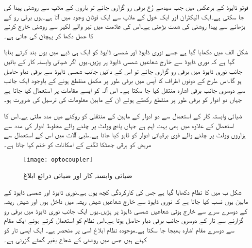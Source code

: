 فوٹو ڈایوڈ کے برعکس   میں جب سیدھے رُخ برقی رو گزاری جائے تو  باروں کے ملاپ سے روشنی پیدا کی جا سکتی ہے۔ایک الیکٹران اور ایک خول کے ملاپ سے ایک فوٹان وجود میں آتا ہے۔یوں برقی رو کے بڑھانے سے پیدا روشنی کی شدت بڑھتی ہے۔اس کی علامت میں تیر والے لکیر سے روشنی خارج کرنے کا عمل دکھا کر پہچان کی جاتی ہے۔

شکل  الف میں   دکھایا گیا ہے جسے نوری ڈایوڈ اور شمسی ڈایوڈ کو ایک ہی ڈبے میں یوں بند کرتے بنایا گیا ہے کہ نوری ڈایوڈ سے خارج شعاعیں شمسی ڈایوڈ پر پڑیں۔یوں اگر ضیائی وابستہ کار کے بائیں جانب نوری ڈایوڈ میں برقی رو گزاری جائے تو اس کے دائیں جانب شمسی ڈایوڈ سے برقی دباو حاصل ہو گا۔اس طرح  کے دونوں اطراف کا آپس میں برقی طور پر مکمل منقطع ہونے کے باوجود ایک جانب سے دوسری جانب برقی اشارہ منتقل کیا جا سکتا  ہے۔ اس آلہ کو ایسے مقامات پر استعمال کیا جاتا ہے جہاں دو ادوار کو برقی طور پر منقطع رکھتے ہوئے ان کے مابین معلومات کی ترسیل کی ضرورت ہو۔

ضیائی وابستہ کار کے استعمال سے دو ادوار کے مابین  کے منتقلی کو روکنے میں مدد ملتی ہے۔اس کا استعمال  کے علاوہ   میں بھی بہت اہم ہے جہاں پانچ وولٹ پر چلنے والے مخلوط ادوار کی مدد سے ہزاروں وولٹ پر چلنے والے قوی برقیاتی ادوار کو قابو کیا جاتا ہے۔طبی آلات میں اس کے استعمال سے مریض کو برقی جھٹکا لگنے کے امکانات کو ختم کیا جاتا ہے۔
\begin{figure}
\centering
\texttt{[image: optocoupler]}
\caption{ضیائی وابستہ کار اور ضیائی ذرائع ابلاغ}
\label{شکل_ضیائی_وابستہ_کار}
\end{figure}
شکل  ب میں   کا نظام دکھایا گیا ہے جس کی کارکردگی کچھ یوں ہے۔نوری ڈایوڈ اور شمسی ڈایوڈ کے مابین  یوں نسب کیا جاتا ہے کہ نوری ڈایوڈ سے خارج شعاعیں شیش ریشہ میں داخل ہوں اور شیش ریشہ کے دوسرے سرے سے خارج ہوتی شعاعیں شمسی ڈایوڈ پر پڑیں۔یوں ایک جانب نوری ڈایوڈ میں برقی رو گزارنے سے تار کے دوسری جانب برقی دباو حاصل ہوتا ہے۔اس نظام کو استعمال کرتے ہوئے ایک مقام سے دوسرے مقام اشارہ بھیجا جا سکتا ہے۔موجودہ نظام ابلاغ اسی پر منحصر ہے۔ ایک ایسی تار کو کہتے ہیں جس میں روشنی کے شعاع بغیر گھٹے گزرتی ہے۔ 

